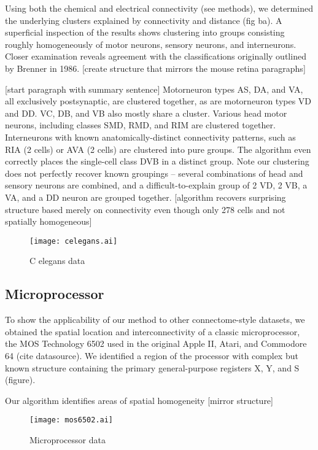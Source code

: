\documentclass{nature}
\begin{document}
Using both the chemical and electrical connectivity (see methods), we
determined the underlying clusters explained by connectivity and
distance (fig ba). A superficial inspection of the results shows
clustering into groups consisting roughly homogeneously of motor
neurons, sensory neurons, and interneurons. Closer examination reveals
agreement with the classifications originally outlined by Brenner in
1986.  [create structure that mirrors the mouse retina paragraphs]

[start paragraph with summary sentence] Motorneuron types AS, DA, and
VA, all exclusively postsynaptic, are clustered together, as are
motorneuron types VD and DD. VC, DB, and VB also mostly share a
cluster. Various head motor neurons, including classes SMD, RMD, and
RIM are clustered together. Interneurons with known
anatomically-distinct connectivity patterns, such as RIA (2 cells) or
AVA (2 cells) are clustered into pure groups. The algorithm even
correctly places the single-cell class DVB in a distinct group. Note
our clustering does not perfectly recover known groupings -- several
combinations of head and sensory neurons are combined, and a
difficult-to-explain group of 2 VD, 2 VB, a VA, and a DD neuron are
grouped together. [algorithm recovers surprising structure based
merely on connectivity even though only 278 cells and not spatially
homogeneous]








\begin{figure}
  \centering 
  \centerline{\texttt{[image: celegans.ai]}}
  \caption{C elegans data}
\end{figure}

\subsection{Microprocessor}

To show the applicability of our method to other connectome-style
datasets, we obtained the spatial location and interconnectivity of a
classic microprocessor, the MOS Technology 6502 used in the original
Apple II, Atari, and Commodore 64 (cite datasource). We identified a
region of the processor with complex but known structure containing
the primary general-purpose registers X, Y, and S (figure).

Our algorithm identifies areas of spatial homogeneity 
[mirror structure] 


\begin{figure}
  \centering 
  \centerline{\texttt{[image: mos6502.ai]}}
  \caption{Microprocessor data}
\end{figure}
\end{document}
